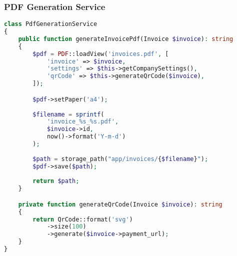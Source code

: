 \documentclass[a4paper]{report}
\begin{document}
\subsubsection{PDF Generation Service}
\begin{lstlisting}[language=PHP]
class PdfGenerationService
{
    public function generateInvoicePdf(Invoice $invoice): string
    {
        $pdf = PDF::loadView('invoices.pdf', [
            'invoice' => $invoice,
            'settings' => $this->getCompanySettings(),
            'qrCode' => $this->generateQrCode($invoice),
        ]);

        $pdf->setPaper('a4');
        
        $filename = sprintf(
            'invoice_%s_%s.pdf',
            $invoice->id,
            now()->format('Y-m-d')
        );
        
        $path = storage_path("app/invoices/{$filename}");
        $pdf->save($path);
        
        return $path;
    }

    private function generateQrCode(Invoice $invoice): string
    {
        return QrCode::format('svg')
            ->size(100)
            ->generate($invoice->payment_url);
    }
}
\end{lstlisting}
\end{document}
